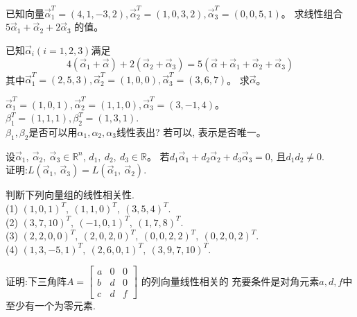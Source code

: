 \begin{ex}\label{4.2}
已知向量$\vec{\alpha}_1^T=(4,1,-3,2), \vec{\alpha}_2^T=(1,0,3,2), \vec{\alpha}_3^T=(0,0,5,1)$。
求线性组合$5\vec{\alpha}_1+\vec{\alpha}_2+2\vec{\alpha}_3$ 的值。
\end{ex}

\begin{ex}\label{4.3}
已知$\vec{\alpha}_i(i=1, 2, 3)$满足
$$4(\vec{\alpha}_1+\vec{\alpha})+2(\vec{\alpha}_2+\vec{\alpha}_3)=5(\vec{\alpha}+\vec{\alpha}_1+\vec{\alpha}_2+\vec{\alpha}_3)$$
其中$\vec{\alpha}_1^T=(2,5,3), \vec{\alpha}_2^T=(1,0,0), \vec{\alpha}_3^T=(3,6,7)$。 求$\vec{\alpha}$。
\end{ex}

\begin{ex}\label{4.4}
$\vec{\alpha}_1^T=(1,0,1), \vec{\alpha}_2^T=(1,1,0), \vec{\alpha}_3^T=(3,-1,4)$。$\beta_1^T=(1,1,1), \beta_2^T=(1,3,1)$.\\
$\beta_1,\beta_2$是否可以用$\alpha_1,\alpha_2,\alpha_3$线性表出? 若可以, 表示是否唯一。
\end{ex}

\begin{ex}\label{4.5}
设$\vec{\alpha}_1,\ \vec{\alpha}_2,\ \vec{\alpha}_3\in \mathbb{R}^n$, $d_1,\ d_2,\ d_3 \in \mathbb{R}$。
若$d_1\vec{\alpha}_1+d_2\vec{\alpha}_2+d_3\vec{\alpha}_3=0$, 且$d_1d_2\not=0$.\\
证明:$L(\vec{\alpha}_1,\ \vec{\alpha}_3)=L(\vec{\alpha}_1,\ \vec{\alpha}_2).$
\end{ex}

\begin{ex}\label{4.6}
判断下列向量组的线性相关性.\\
(1) $(1,0,1)^T,\ (1,1,0)^T,\ (3,5,4)^T.$\\
(2) $(3,7,10)^T,\ (-1,0,1)^T,\ (1,7,8)^T.$\\
(3) $(2,2,0,0)^T,\  (2,0,2,0)^T,\ (0,0,2,2)^T,\ (0,2,0,2)^T.$\\
(4) $(1,3,-5,1)^T,\ (2,6,0,1)^T,\ (3,9,7,10)^T.$
\end{ex}

\begin{ex}\label{4.7}
证明:下三角阵$A=\begin{bmatrix} a&0&0\\b&d&0\\c&d&f\end{bmatrix}$ 的列向量线性相关的
充要条件是对角元素$a,d,f$中至少有一个为零元素.
\end{ex}

